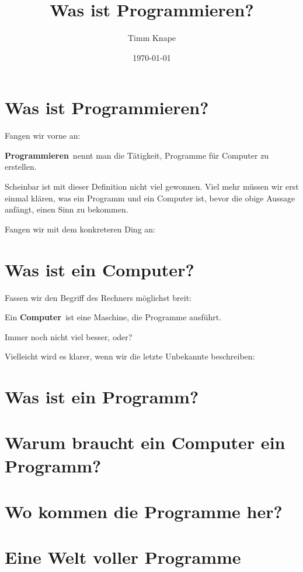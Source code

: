 \documentclass[a5paper,ngerman]{article}
\title{\color{emph}Was ist Programmieren?}
\author{Timm Knape}
\date{\today}
\begin{document}
\pagecolor{background}
\color{normal}
\allsectionsfont{\color{emph}\mdseries}
\pagestyle{plain}
\maketitle
\thispagestyle{fancy}
\begin{multicols}{2}

\end{multicols}
\section{Was ist Programmieren?}
\begin{multicols}{2}

Fangen wir vorne an:

\textbf{Programmieren}\ nennt man die Tätigkeit, Programme für Computer zu
erstellen.

Scheinbar ist mit dieser Definition nicht viel gewonnen.
Viel mehr müssen wir erst einmal klären, was ein Programm und ein
Computer ist, bevor die obige Aussage anfängt, einen Sinn zu bekommen.

Fangen wir mit dem konkreteren Ding an:

\end{multicols}
\section{Was ist ein Computer?}
\begin{multicols}{2}

Fassen wir den Begriff des Rechners möglichst breit:

Ein \textbf{Computer}\ ist eine Maschine, die Programme ausführt.

Immer noch nicht viel besser, oder?

Vielleicht wird es klarer, wenn wir die letzte Unbekannte beschreiben:

\end{multicols}
\section{Was ist ein Programm?}
\begin{multicols}{2}

\end{multicols}
\section{Warum braucht ein Computer ein Programm?}
\begin{multicols}{2}

\end{multicols}
\section{Wo kommen die Programme her?}
\begin{multicols}{2}

\end{multicols}
\section{Eine Welt voller Programme}
\end{document}
